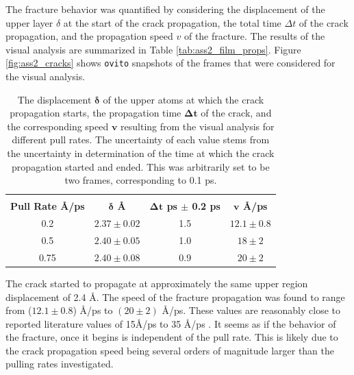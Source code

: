 \documentclass[10pt,a4paper]{labreport}
\begin{document}
The fracture behavior was quantified by considering the displacement of the upper layer $\delta$ at the start of the crack propagation, the total time $\Delta t$ of the crack propagation, and the propagation speed $v$ of the fracture.   
The results of the visual analysis are summarized in Table \ref{tab:ass2_film_props}. 
Figure \ref{fig:ass2_cracks} shows \texttt{ovito} snapshots of the frames that were considered for the visual analysis. 
\begin{table}
  \centering
  \caption{The displacement $\bm{\delta}$ of the upper atoms  at which the crack propagation starts, the propagation time $\bm{\Delta t}$ of the crack, and the corresponding speed $\bm{v}$ resulting from the visual analysis for different pull rates. The uncertainty of each value stems from the uncertainty in determination of the time at which the crack propagation started and ended. This was arbitrarily set to be two frames, corresponding to 0.1 ps. }
  \begin{tabular}{cccc} \hline \\[-0.8em]
    \textbf{Pull Rate \AA/ps} & \textbf{$\bm{\delta}$ \AA}  & \textbf{$\bm{\Delta t}$ ps $\pm$ 0.2 ps} & \textbf{$\bm{v}$ \AA/ps} \\ \hline
    0.2  & $2.37 \pm 0.02$ & 1.5 & $12.1 \pm 0.8$ \\
    0.5  & $2.40 \pm 0.05$ & 1.0 & $18 \pm 2$ \\
    0.75 & $2.40 \pm 0.08$ & 0.9 & $20 \pm 2$ \\ \hline 
  \end{tabular}
  \label{tab:ass2_crack-props}
\end{table}
The crack started to propagate at approximately the same upper region displacement of 2.4 \AA. 
The speed of the fracture propagation was found to range from ($12.1 \pm 0.8$) \AA/ps to $(20 \pm 2)$ \AA/ps.  
These values are reasonably close to reported literature values of 15\AA/ps to 35 \AA/ps \cite{rackRealtimeDirectDiffraction2016}. It seems as if the behavior of the fracture, once it begins is independent of the pull rate. This is likely due to the crack propagation speed being several orders of magnitude larger than the pulling rates investigated. 
\end{document}
